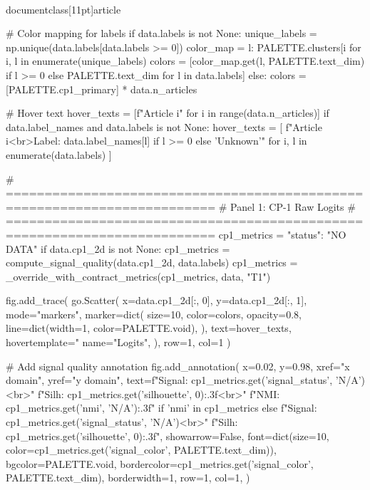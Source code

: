 \\documentclass[11pt]{article}
\begin{document}
\begin{CodeBlock}
    # Color mapping for labels
    if data.labels is not None:
        unique_labels = np.unique(data.labels[data.labels >= 0])
        color_map = {l: PALETTE.clusters[i %
                     for i, l in enumerate(unique_labels)}
        colors = [color_map.get(l, PALETTE.text_dim) if l >= 0 else PALETTE.text_dim
                  for l in data.labels]
    else:
        colors = [PALETTE.cp1_primary] * data.n_articles

    # Hover text
    hover_texts = [f"Article {i}" for i in range(data.n_articles)]
    if data.label_names and data.labels is not None:
        hover_texts = [
            f"Article {i}<br>Label: {data.label_names[l] if l >= 0 else 'Unknown'}"
            for i, l in enumerate(data.labels)
        ]

    # =========================================================================
    # Panel 1: CP-1 Raw Logits
    # =========================================================================
    cp1_metrics = {"status": "NO DATA"}
    if data.cp1_2d is not None:
        cp1_metrics = compute_signal_quality(data.cp1_2d, data.labels)
        cp1_metrics = _override_with_contract_metrics(cp1_metrics, data, "T1")

        fig.add_trace(
            go.Scatter(
                x=data.cp1_2d[:, 0],
                y=data.cp1_2d[:, 1],
                mode="markers",
                marker=dict(
                    size=10,
                    color=colors,
                    opacity=0.8,
                    line=dict(width=1, color=PALETTE.void),
                ),
                text=hover_texts,
                hovertemplate="%
                name="Logits",
            ),
            row=1, col=1
        )

        # Add signal quality annotation
        fig.add_annotation(
            x=0.02, y=0.98,
            xref="x domain", yref="y domain",
            text=f"Signal: {cp1_metrics.get('signal_status', 'N/A')}<br>"
                 f"Silh: {cp1_metrics.get('silhouette', 0):.3f}<br>"
                 f"NMI: {cp1_metrics.get('nmi', 'N/A'):.3f}" if 'nmi' in cp1_metrics else
                 f"Signal: {cp1_metrics.get('signal_status', 'N/A')}<br>"
                 f"Silh: {cp1_metrics.get('silhouette', 0):.3f}",
            showarrow=False,
            font=dict(size=10, color=cp1_metrics.get('signal_color', PALETTE.text_dim)),
            bgcolor=PALETTE.void,
            bordercolor=cp1_metrics.get('signal_color', PALETTE.text_dim),
            borderwidth=1,
            row=1, col=1,
        )


\end{CodeBlock}
\end{document}
